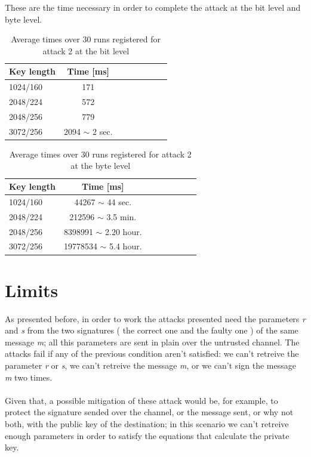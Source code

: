 \documentclass[11pt,english]{article}
\begin{document}
These are the time necessary in order to complete the attack at the bit level and byte level.
\\

\begin{table}[H]
\caption{Average times over 30 runs registered for attack 2 at the bit level}
\begin{center}
\begin{tabular}{l*{6}{c}r}
Key length        & Time [ms] \\
\hline
1024/160 &      171  \\
2048/224 &      572   \\
2048/256 &      779  \\
3072/256 &      2094  $\mathtt{\sim}$ 2 sec. \\ 
\end{tabular}
\end{center}
\end{table}


\begin{table}[H]
\caption{Average times over 30 runs registered for attack 2 at the byte level}
\begin{center}
\begin{tabular}{l*{6}{c}r}
Key length        & Time [ms] \\
\hline
1024/160 &        44267  $\mathtt{\sim}$ 44 sec. \\
2048/224 &       212596  $\mathtt{\sim}$ 3.5 min.\\
2048/256 &       8398991  $\mathtt{\sim}$ 2.20 hour. \\
3072/256 &       19778534  $\mathtt{\sim}$ 5.4 hour. \\
\end{tabular}
\end{center}
\end{table}


\section{Limits}
As presented before, in order to work the attacks presented need the parameters \textit{r} and \textit{s} from the two signatures ( the correct one and the faulty one ) of the same message \textit{m}; all this parameters are sent in plain over the untrusted channel. 
The attacks fail if any of the previous condition aren't satisfied: we can't retreive the parameter \textit{r} or \textit{s}, we can't retreive the message \textit{m}, or we can't sign the message \textit{m} two times.\\\\
Given that, a possible mitigation of these attack would be, for example, to protect the signature sended over the channel, or the  message sent, or why not both, with the public key of the destination; in this scenario we can't retreive enough parameters in order to satisfy the equations that calculate the private key.
\end{document}
